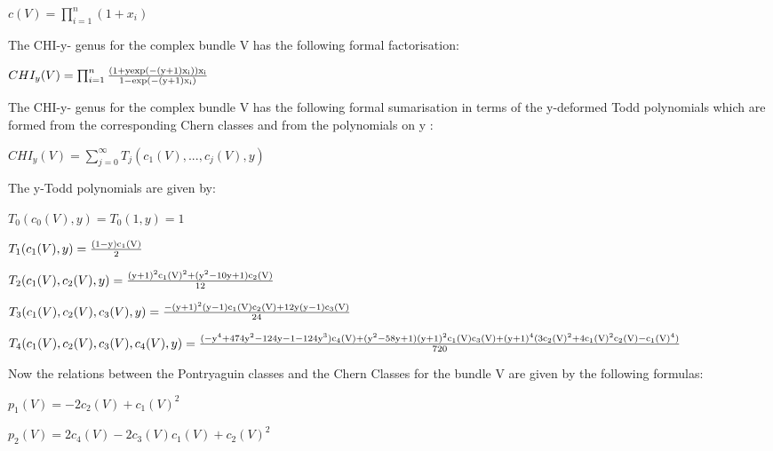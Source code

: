 \documentclass[a4paper,a4paper]{article}
\begin{document}
\begin{center}
{  $ c(V) = \prod_{i=1}^{n}(1+x_i)$ }
\end{center}
The  CHI-y- genus for the complex bundle V has the following formal factorisation:
\begin{center}
{  $ CHI_y(V) = \prod_{i=1}^n\frac{\rm(1+yexp(-(y+1)x_i))x_i }{\rm 1-exp(-(y+1)x_i)}$ }
\end{center}

The CHI-y- genus for the complex bundle V has the following formal sumarisation in terms of the y-deformed Todd polynomials which are formed from the corresponding Chern classes and from the polynomials on y :
\begin{center}
{  $CHI_y(V)  = \sum_{j=0}^{\infty}T_j(c_1(V),...,c_j(V),y) $ }
\end{center}

The y-Todd  polynomials are given by:
\begin{center}
{  $ T_0(c_0(V),y) =T _0(1,y)=1 $ }
\end{center}
\begin{center}
{  $ T_1(c_1(V),y) = \frac{\rm (1-y)c_1(V)}{\rm 2} $ }
\end{center}
\begin{center}
{  $ T_2(c_1(V),c_2(V),y) = \frac{\rm (y+1)^2c_1(V)^2+(y^2-10y+1)c_2(V)}{\rm 12} $ }
\end{center}
\begin{center}
{  $ T_3(c_1(V),c_2(V),c_3(V),y) = \frac{\rm -(y+1)^2(y-1)c_1(V)c_2(V)+12y(y-1)c_3(V)}{\rm 24} $ }
\end{center}
\begin{center}
{  $ T_4(c_1(V),c_2(V),c_3(V),c_4(V),y) = \frac{\rm (-y^4+474y^2-124y-1-124y^3)c_4(V)+(y^2-58y+1)(y+1)^2c_1(V)c_3(V)+(y+1)^4(3c_2(V)^2+4c_1(V)^2c_2(V)-c_1(V)^4)}{\rm 720} $ }
\end{center}

Now the relations between the Pontryaguin classes and the Chern Classes for the bundle V are given by the following formulas:

\begin{center}
{  $ p_1(V) = -2c_2(V)+c_1(V)^2$ }
\end{center}

\begin{center}
{  $ p_2(V) = 2c_4(V)-2c_3(V)c_1(V)+c_2(V)^2$ }
\end{center}
\end{document}
